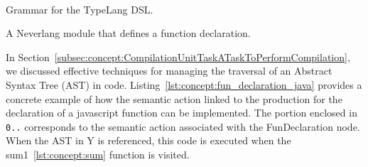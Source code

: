 \begin{Listing}
\begin{bnf*}
    { \bnfor {} \bnfor {}}\\
    {  \bnfts{ \}} \bnftd{ [}    \bnfts{ \{ }  \bnfts{ \}} \bnftd{]}}\\
    { \bnfor {} \bnfor {}}\\
    { }\\
    { }\\
    {\bnfts{\$} }\\
    {\bnfts{\#} }\\
    {\bnfts{[0-9]}}\\
    {}\\
    {}\\
    {}\\
    {}
\end{bnf*}
  \caption{Grammar for the TypeLang DSL.}
  \label{lst:concept:typelang_grammar}
\end{Listing}

\begin{Listing}
    \centering
    \caption{A Neverlang module that defines a function declaration.}
    \label{lst:concept:fun_declaration_java}
\end{Listing}


In Section~\ref{subsec:concept:CompilationUnitTaskATaskToPerformCompilation}, we discussed effective techniques for managing the traversal of an Abstract Syntax Tree (AST) in code. Listing~\ref{lst:concept:fun_declaration_java} provides a concrete example of how the semantic action linked to the production for the declaration of a javascript function can be implemented. The portion enclosed in \texttt{0.{}.} corresponds to the semantic action associated with the FunDeclaration node. When the AST in Y is referenced, this code is executed when the sum1~\ref{lst:concept:sum} function is visited.

